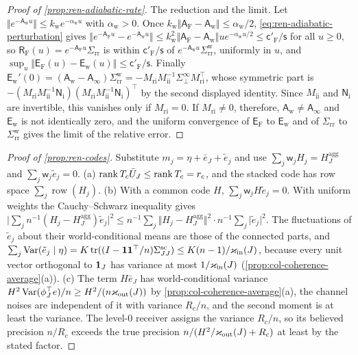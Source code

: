 \begin{proof}[Proof of \cref{prop:ren-adiabatic-rate}]
The reduction and the limit. Let $\Vert e^{-\mathsf A_{\mathrm w}u}\Vert\le k_{\mathrm w}e^{-\alpha_{\mathrm w}u}$ with $\alpha_{\mathrm w}>0$. Once $k_{\mathrm w}\Vert\mathsf A_{\mathrm F}-\mathsf A_{\mathrm w}\Vert\le\alpha_{\mathrm w}/2$, \eqref{eq:ren-adiabatic-perturbation} gives $\Vert e^{-\mathsf A_{\mathrm F}u}-e^{-\mathsf A_{\mathrm w}u}\Vert\le k_{\mathrm w}^2\Vert\mathsf A_{\mathrm F}-\mathsf A_{\mathrm w}\Vert ue^{-\alpha_{\mathrm w}u/2}\le\mathsf c'_{\mathrm F}/\mathsf s$ for all $u\ge0$, so $\mathsf R_{\mathrm F}(u)=e^{-\mathsf A_{\mathrm F}u}\Sigma_{\mathrm{rr}}$ is within $\mathsf c'_{\mathrm F}/\mathsf s$ of $e^{-\mathsf A_{\mathrm w}u}\Sigma^{\mathrm w}_{\mathrm{rr}}$, uniformly in $u$, and $\sup_u\Vert\mathsf E_{\mathrm F}(u)-\mathsf E_{\mathrm w}(u)\Vert\le\mathsf c'_{\mathrm F}/\mathsf s$. Finally $\mathsf E_{\mathrm w}'(0)=(\mathsf A_{\mathrm w}-\mathsf A_\infty)\Sigma^{\mathrm w}_{\mathrm{rr}}=-M_{\mathrm{ri}}M_{\mathrm{ii}}^{-1}\Sigma^\infty_\perp M_{\mathrm{ri}}^\top$, whose symmetric part is $-(M_{\mathrm{ri}}M_{\mathrm{ii}}^{-1}\mathsf N_{\mathrm i})(M_{\mathrm{ri}}M_{\mathrm{ii}}^{-1}\mathsf N_{\mathrm i})^\top$ by the second displayed identity. Since $M_{\mathrm{ii}}$ and $\mathsf N_{\mathrm i}$ are invertible, this vanishes only if $M_{\mathrm{ri}}=0$. If $M_{\mathrm{ri}}\ne0$, therefore, $\mathsf A_{\mathrm w}\ne\mathsf A_\infty$ and $\mathsf E_{\mathrm w}$ is not identically zero, and the uniform convergence of $\mathsf E_{\mathrm F}$ to $\mathsf E_{\mathrm w}$ and of $\Sigma_{\mathrm{rr}}$ to $\Sigma^{\mathrm w}_{\mathrm{rr}}$ gives the limit of the relative error.
\end{proof}

\begin{proof}[Proof of \cref{prop:ren-codes}]
Substitute $m_j=\eta+\bar e_J+\tilde e_j$ and use $\sum_j\mathsf w_jH_j=H^{\mathrm{agg}}_J$ and $\sum_j\mathsf w_j\tilde e_j=0$. (a) $\operatorname{rank} T_c\bar U_J\le\operatorname{rank} T_c=r_c$, and the stacked code has row space $\sum_j\operatorname{row}(H_j)$. (b) With a common code $H$, $\sum_j\mathsf w_jH\tilde e_j=0$. With uniform weights the Cauchy--Schwarz inequality gives $\lvert\sum_jn^{-1}(H_j-H^{\mathrm{agg}}_J)\tilde e_j\rvert^2\le n^{-1}\sum_j\Vert H_j-H^{\mathrm{agg}}_J\Vert^2\cdot n^{-1}\sum_j\lvert\tilde e_j\rvert^2$. The fluctuations of $\tilde e_j$ about their world-conditional means are those of the connected parts, and $\sum_j\operatorname{Var}(\tilde e_j\mid\eta)=K\operatorname{tr}((I-\mathbf{1}\mathbf{1}^\top/n)\Sigma^{\mathrm{sc}}_{JJ})\le K(n-1)/\varkappa_{\mathrm{in}}(J)$, because every unit vector orthogonal to $\mathbf{1}_J$ has variance at most $1/\varkappa_{\mathrm{in}}(J)$ (\cref{prop:col-coherence-average}(a)). (c) The term $H\bar e_J$ has world-conditional variance $H^2\operatorname{Var}(\phi_J^\top e)/n\ge H^2/(n\varkappa_{\mathrm{out}}(J))$ by \cref{prop:col-coherence-average}(a), the channel noises are independent of it with variance $R_c/n$, and the second moment is at least the variance. The level-0 receiver assigns the variance $R_c/n$, so its believed precision $n/R_c$ exceeds the true precision $n/(H^2/\varkappa_{\mathrm{out}}(J)+R_c)$ at least by the stated factor.
\end{proof}


